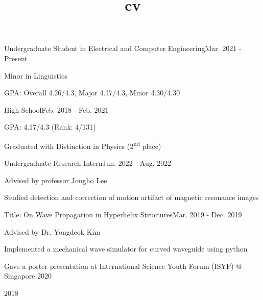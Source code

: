 \documentclass{cv}
\title{cv}
\begin{document}
\cvheader






{Undergraduate Student in Electrical and Computer Engineering}{Mar. 2021 - Present}
{
    \item Minor in Linguistics
    \item GPA: Overall 4.26/4.3, Major 4.17/4.3, Minor 4.30/4.30
}
{High School}{Feb. 2018 - Feb. 2021}
{
    \item GPA: 4.17/4.3 (Rank: 4/131) 
    \item Graduated with Distinction in Physics (2\textsuperscript{nd} place)
}


{Undergraduate Research Intern}{Jun. 2022 - Aug. 2022}
{
    \item Advised by professor Jongho Lee
    \item Studied detection and correction of motion artifact of magnetic resonance images
}

{Title: On Wave Propagation in Hyperhelix Structures}{Mar. 2019 - Dec. 2019}
{
    \item Advised by Dr. Yongdeok Kim
    \item Implemented a mechanical wave simulator for curved waveguide using python %
    \item Gave a poster presentation at International Science Youth Forum (ISYF) @ Singapore 2020
}

 {2018}
\end{document}

